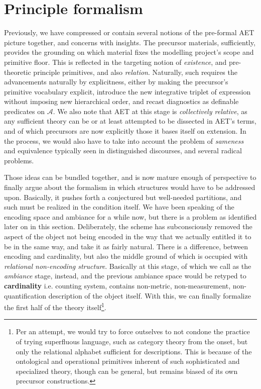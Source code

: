 \section{Principle formalism}

Previously, we have compressed or contain several notions of the pre-formal AET picture together, and concerns with insights. The precursor materials, sufficiently, provides the grounding on which material fixes the modelling project's scope and primitive floor. This is reflected in the targeting notion of \textit{existence}, and pre-theoretic principle primitives, and also \textit{relation}. Naturally, such requires the advancements naturally by explicitness, either by making the precursor's primitive vocabulary explicit, introduce the new integrative triplet of expression without imposing new hierarchical order, and recast diagnostics as definable predicates on $\mathcal{A}$. We also note that AET at this stage is \textit{collectively relative}, as any sufficient theory can be or at least attempted to be dissected in AET's terms, and of which precursors are now explicitly those it bases itself on extension. In the process, we would also have to take into account the problem of \textit{sameness} and equivalence typically seen in distinguished discourses, and several radical problems. 

Those ideas can be bundled together, and is now mature enough of perspective to finally argue about the formalism in which structures would have to be addressed upon. Basically, it pushes forth a conjectured but well-needed partitions, and such must be realized in the condition itself. We have been speaking of the encoding space and ambiance for a while now, but there is a problem as identified later on in this section. Deliberately, the scheme has subconsciously removed the aspect of the object not being encoded in the way that we actually entitled it to be in the same way, and take it as fairly natural. There is a difference, between encoding and cardinality, but also the middle ground of which is occupied with \textit{relational non-encoding structure}. Basically at this stage, of which we call as the \textit{ambiance} stage, instead, and the previous ambiance space would be retyped to \textbf{cardinality} i.e. counting system, contains non-metric, non-measurement, non-quantification description of the object itself. With this, we can finally formalize the first half of the theory itself\footnote{Per an attempt, we would try to force outselves to not condone the practice of trying superfluous language, such as category theory from the onset, but only the relational alphabet sufficient for descriptions. This is because of the ontological and operational primitives inherent of such sophisticated and specialized theory, though can be general, but remains biased of its own precursor constructions.}.

